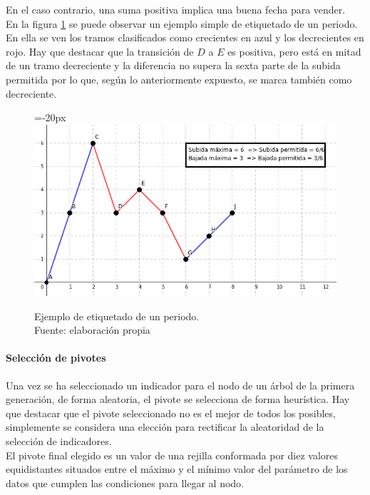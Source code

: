     En el caso contrario, una suma positiva implica una buena fecha para vender.\\
    
    En la figura \ref{fig:tagging} se puede observar un ejemplo simple de etiquetado de un periodo. En ella se ven los tramos clasificados como crecientes en azul y los decrecientes en rojo. Hay que destacar que la transici\'on de $D$ a $E$ es positiva, pero est\'a en mitad de un tramo decreciente y la diferencia no supera la sexta parte de la subida permitida por lo que, seg\'un lo anteriormente expuesto, se marca tambi\'en como decreciente.
    
     	\begin{figure}[H]
    		\centering\leftskip=-20px
    		\includegraphics[scale=0.65]{imagenes/tagging.png}
    	    \caption[Ejemplo de etiquetado de un periodo]{Ejemplo de etiquetado de un periodo.\\ Fuente: elaboraci\'on propia}
    		\label{fig:tagging}
	   \end{figure}
    
\paragraph{Selecci\'on de pivotes}
Una vez se ha seleccionado un indicador para el nodo de un \'arbol de la primera generaci\'on, de forma aleatoria, el pivote se selecciona de forma heur\'istica. Hay que destacar que el pivote seleccionado no es el mejor de todos los posibles, simplemente se considera una elecci\'on para rectificar la aleatoridad de la selecci\'on de indicadores.\\

El pivote final elegido es un valor de una rejilla conformada por diez valores equidistantes situados entre el m\'aximo y el m\'inimo valor del par\'ametro de los datos que cumplen las condiciones para llegar al nodo. 

